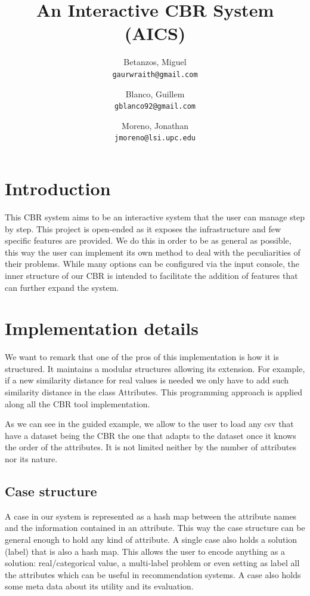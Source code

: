 \documentclass[11pt]{article}
\title{An Interactive CBR System (AICS)}
\author{
  Betanzos, Miguel\\
  \texttt{gaurwraith@gmail.com}
  \and
  Blanco, Guillem\\
  \texttt{gblanco92@gmail.com}
  \and
  Moreno, Jonathan\\
  \texttt{jmoreno@lsi.upc.edu}
}
\date{}
\begin{document}
\maketitle


\section{Introduction}

This CBR system aims to be an interactive system that the user can manage step by step. This project is open-ended as it exposes the infrastructure and few specific features are provided. We do this in order to be as general as possible, this way the user can implement its own method to deal with the peculiarities of their problems. While many options can be configured via the input console, the inner structure of our CBR is intended to facilitate the addition of features that can further expand the system.

\section{Implementation details}

We want to remark that one of the pros of this implementation is how it is structured. It maintains a modular structures allowing its extension. For example, if a new similarity distance for real values is needed we only have to add such similarity distance in the class Attributes. This programming approach is applied along all the CBR tool implementation.

As we can see in the guided example, we allow to the user to load any csv that have a dataset being the CBR the one that adapts to the dataset once it knows the order of the attributes. It is not limited neither by the number of attributes nor its nature.

\subsection{Case structure}

A case in our system is represented as a hash map between the attribute names and the information contained in an attribute. This way the case structure can be general enough to hold any kind of attribute. A single case also holds a solution (label) that is also a hash map. This allows the user to encode anything as a solution: real/categorical value, a multi-label problem or even setting as label all the attributes which can be useful in recommendation systems. A case also holds some meta data about its utility and its evaluation.
\end{document}
